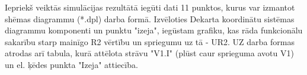 \documentclass {report}
\begin{document}
\indent Iepriekš veiktās simulācijas rezultātā iegūti dati 11 punktos, kurus var izmantot shēmas diagrammu (*.dpl) darba formā. Izvēloties Dekarta koordinātu sistēmas diagrammu komponenti un punktu "izeja", iegūstam grafiku, kas rāda funkcionālu sakarību starp mainīgo R2 vērtību un spriegumu uz tā - UR2. \indent UZ darba formas atrodas arī tabula, kurā attēlota strāvu "V1.I" (plūst caur sprieguma avotu V1) un el. ķēdes punkta "Izeja" attiecība.
\end{document}
